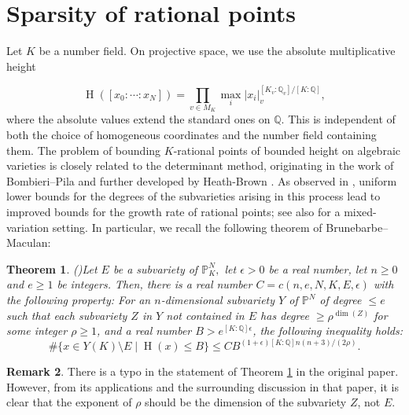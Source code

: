\documentclass[12 pt]{amsart}
\newtheorem{theorem}{Theorem}[section]
\theoremstyle{definition}
\newtheorem{Remark}[theorem]{Remark}
\newcommand{\Q}{\mathbb{Q}} %
\newcommand{\Proj}{\mathbb{P}}
\begin{document}
\section{Sparsity of rational points}\label{sparsity}

Let \(K\) be a number field. On projective space, we use the absolute
multiplicative height

$$
\operatorname{H}([x_0:\cdots:x_N])
=
\prod_{v\in M_K}
\max_i |x_i|_v^{[K_v:\mathbb Q_v]/[K:\mathbb Q]},
$$
where the absolute values extend the standard ones on \(\mathbb Q\).
This is independent of both the choice of homogeneous coordinates and
the number field containing them. The problem of bounding \(K\)-rational points of bounded height on algebraic varieties is closely related to the determinant method, originating in the work of Bombieri--Pila \cite{bombieri1989number} and further developed by Heath-Brown \cite{heath2002density}. As observed in \cite{ellenberg2023sparsity,brunebarbe2022counting}, uniform lower bounds for the degrees of the subvarieties arising in this process lead to improved bounds for the growth rate of rational points; see also \cite{chiu2025arithmetic} for a mixed-variation setting. In particular, we recall the following theorem of Brunebarbe--Maculan:

\begin{theorem}(\cite[Theorem 4.4]{brunebarbe2022counting})\label{counting}
    Let $E$ be a subvariety of $\mathbb{P}_{K}^{N},$ let $\epsilon>0$ be a real number, let $n\ge 0$ and $e\ge 1$ be integers. Then, there is a real number $C=c(n,e, N, K,E,\epsilon)$ with the following property:
For an  $n$-dimensional subvariety $Y$ of $\Proj^{N}$
 of degree $\le e$ such that each subvariety $Z$ in $Y$ not contained in $E$ has degree $\ge \rho^{\operatorname{dim}(Z)}$ for some integer $\rho \ge 1$, and a real number $B > e^{[K: \Q]\epsilon}$, the following
inequality holds:
$$
\#\{
x\in Y(K)\setminus E \mid \operatorname{H}(x)\le B 
\}
\le
C B^{(1+\epsilon)[K:\Q]n(n+3)/(2\rho)}.$$
\end{theorem}
\begin{Remark}
 There is a typo in the statement of Theorem \ref{counting} in the original paper. However, from its applications and the surrounding discussion in that paper, it is clear that the exponent of \(\rho\) should be the dimension of the subvariety \(Z\), not \(E\).
\end{Remark}
\end{document}
